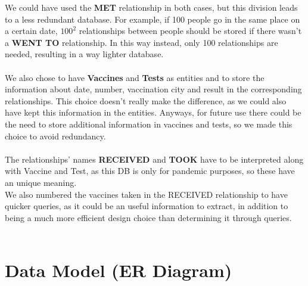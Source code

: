 \documentclass{article}[IEEEtran]
\begin{document}
We could have used the \textbf{MET} relationship in both cases, but this division leads to a less redundant database. For example, if 100 people go in the same place on a certain date, $100^{2}$ relationships between people should be stored if there wasn't a \textbf{WENT TO} relationship. In this way instead, only 100 relationships are needed, resulting in a way lighter database.
\\ \\
We also chose to have \textbf{Vaccines} and \textbf{Tests} as entities and to store the information about date, number, vaccination city and result in the corresponding relationships. This choice doesn't really make the difference, as we could also have kept this information in the entities. Anyways, for future use there could be the need to store additional information in vaccines and tests, so we made this choice to avoid redundancy.
\\\\
The relationships' names \textbf{RECEIVED} and \textbf{TOOK} have to be interpreted along with Vaccine and Test, as this DB is only for pandemic purposes, so these have an unique meaning.
\\
We also numbered the vaccines taken in the RECEIVED relationship to have quicker queries, as it could be an useful information to extract, in addition to being a much more efficient design choice than determining it through queries.
\\ \\


\section{Data Model (ER Diagram)}\label{sec:data}
\end{document}
